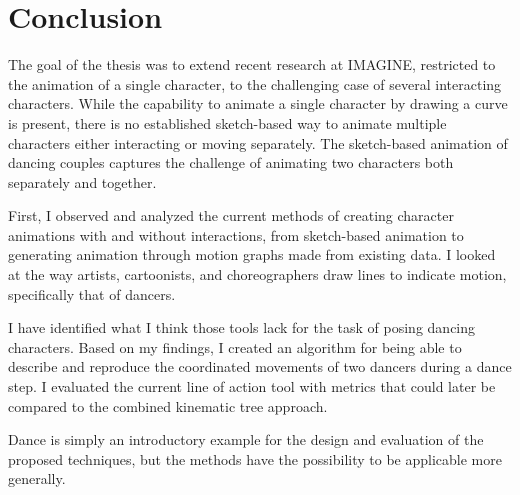 \chapter{Conclusion}\label{chap:conclusion}
The goal of the thesis was to extend recent research at IMAGINE, restricted to the animation of a single character, to the challenging case of several interacting characters. While the capability to animate a single character by drawing a curve is present, there is no established sketch-based way to animate multiple characters either interacting or moving separately. The sketch-based animation of dancing couples captures the challenge of animating two characters both separately and together.

First, I observed and analyzed the current methods of creating character animations with and without interactions, from sketch-based animation to generating animation through motion graphs made from existing data. I looked at the way artists, cartoonists, and choreographers draw lines to indicate motion, specifically that of dancers.

I have identified what I think those tools lack for the task of posing dancing characters. Based on my findings, I created an algorithm for being able to describe and reproduce the coordinated movements of two dancers during a dance step. I evaluated the current line of action tool with metrics that could later be compared to the combined kinematic tree approach.

Dance is simply an introductory example for the design and evaluation of the proposed techniques, but the methods have the possibility to be applicable more generally.